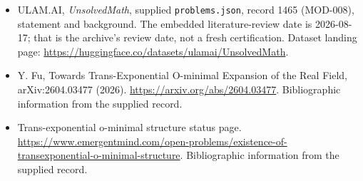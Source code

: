 \documentclass[11pt,a4paper]{article}
\begin{document}
{\small

\begin{itemize}

\item[\hypertarget{source:1465:1}{S1}] ULAM.AI, \emph{UnsolvedMath}, supplied \texttt{problems.json}, record 1465 (MOD-008), statement and background. The embedded literature-review date is 2026-08-17; that is the archive’s review date, not a fresh certification. Dataset landing page: \url{https://huggingface.co/datasets/ulamai/UnsolvedMath}.

\item[\hypertarget{source:1465:2}{S2}] Y. Fu, Towards Trans-Exponential O-minimal Expansion of the Real Field, arXiv:2604.03477 (2026). \url{https://arxiv.org/abs/2604.03477}. Bibliographic information from the supplied record.

\item[\hypertarget{source:1465:3}{S3}] Trans-exponential o-minimal structure status page. \url{https://www.emergentmind.com/open-problems/existence-of-transexponential-o-minimal-structure}. Bibliographic information from the supplied record.

\end{itemize}

}

\label{end:1465}
\end{document}
